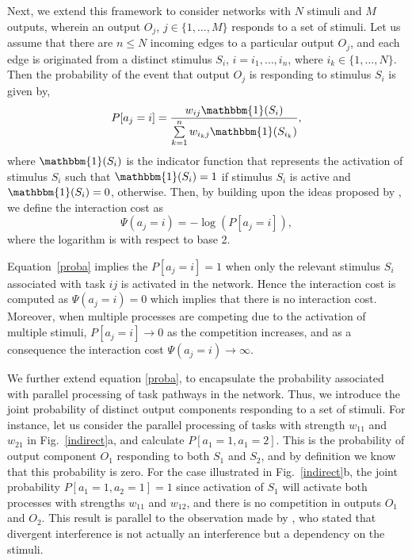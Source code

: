 \documentclass[10pt,letterpaper]{article}
\begin{document}
Next, we extend this framework to consider networks with $N$ stimuli and $M$ outputs, wherein an output $O_j$, $j \in \{1, \ldots, M\}$ responds to a set of stimuli. Let us assume that there are $n \leq N$ incoming edges to a particular output $O_j$, and each edge is originated from a distinct stimulus $S_i$, $i=i_1, \ldots, i_n$, where $i_k \in \{1, \ldots, N\}$. Then the probability of the event that output $O_j$ is responding to stimulus $S_i$ is given by,
\begin{equation}
\label{proba}
P[a_j=i] = \frac{w_{ij} \mathbbm{1}(S_i)}{\sum\limits_{k = 1}^n w_{i_kj}\mathbbm{1}(S_{i_k})},
\end{equation}
where $\mathbbm{1}(S_i)$ is the indicator function that represents the activation of stimulus $S_i$ such that $\mathbbm{1}(S_i)=1$ if stimulus $S_i$ is active and $\mathbbm{1}(S_i)=0$, otherwise. Then, by building upon the ideas proposed by \cite{koechlin2007information}, we define the interaction cost as
\begin{equation}
\Psi(a_j=i) = -\log(P[a_j=i]),
\end{equation}
where the logarithm is with respect to base 2.

Equation~\ref{proba} implies the $P[a_j=i] = 1$ when only the relevant stimulus $S_i$ associated with task $ij$ is activated in the network. Hence the interaction cost is computed as $\Psi(a_j=i) = 0$ which implies that there is no interaction cost. Moreover, when multiple processes are competing due to the activation of multiple stimuli, $P[a_j=i] \rightarrow 0$ as the competition increases, and as a consequence the interaction cost $\Psi(a_j=i) \rightarrow \infty$.

We further extend equation \ref{proba}, to encapsulate the probability associated with parallel processing of task pathways in the network. Thus, we introduce the joint probability of distinct output components responding to a set of stimuli. For instance, let us consider the parallel processing of tasks with strength $w_{11}$ and $w_{21}$ in Fig.~\ref{indirect}a, and calculate $P[a_1=1, a_1=2]$. This is the probability of output component $O_1$ responding to both $S_1$ and $S_2$, and by definition we know that this probability is zero. For the case illustrated in Fig.~\ref{indirect}b, the joint probability $P[a_1=1, a_2=1] = 1$ since activation of $S_1$ will activate both processes with strengths $w_{11}$ and $w_{12}$, and there is no competition in outputs $O_1$ and $O_2$. This result is parallel to the observation made by \cite{CogSci_2016}, who stated that divergent interference is not actually an interference but a dependency on the stimuli.
\end{document}
